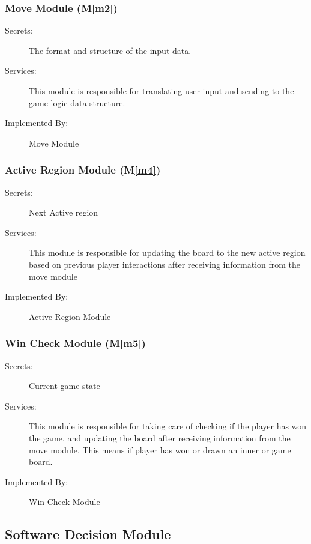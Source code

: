 \documentclass[12pt, titlepage]{article}
\newcommand{\mref}[1]{M\ref{#1}}
\begin{document}
\subsubsection{Move Module (\mref{m2})}
\begin{description}
\item[Secrets:]The format and structure of the input data.
\item[Services:] This module is responsible for translating user input and sending to the game logic data structure.
\item[Implemented By:] Move Module
\end{description}
\subsubsection{Active Region Module (\mref{m4})}
\begin{description}
\item[Secrets:] Next Active region
\item[Services:] This module is responsible for updating the board to the new active region based on previous player interactions after receiving information from the move module
\item[Implemented By:] Active Region Module
\end{description}

\subsubsection{Win Check Module (\mref{m5})}
\begin{description}
\item[Secrets:] Current game state
\item[Services:] This module is responsible for taking care of checking if the player has won the game, and updating the board after receiving information from the move module. This means if player has won or drawn an inner or game board.
\item[Implemented By:] Win Check Module
\end{description}

\subsection{Software Decision Module}
\end{document}
